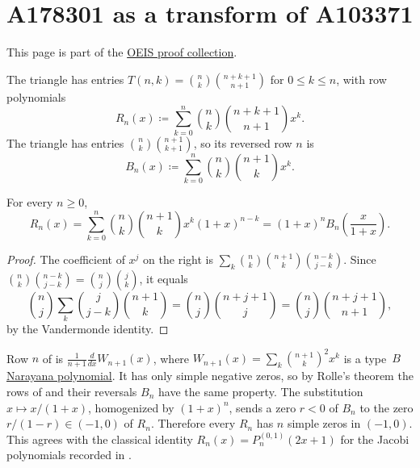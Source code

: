 

\section[oeisProofA178301]{A178301 as a transform of A103371}

This page is part of the \hyperref[oeisProofs]{OEIS proof collection}.

The triangle  has entries
$T(n,k)=\binom{n}{k}\binom{n+k+1}{n+1}$ for $0\leq k\leq n$, with row polynomials
\[
 R_n(x)\coloneqq\sum_{k=0}^n\binom{n}{k}\binom{n+k+1}{n+1}x^k.
\]
The triangle  has entries $\binom{n}{k}\binom{n+1}{k+1}$, so its reversed row $n$
is
\[
 B_n(x)\coloneqq\sum_{k=0}^n\binom{n}{k}\binom{n+1}{k}x^k.
\]

\begin{proposition}
For every $n\geq0$,
\[
 R_n(x)=\sum_{k=0}^n\binom{n}{k}\binom{n+1}{k}x^k(1+x)^{n-k}
 =(1+x)^n B_n\!\left(\frac{x}{1+x}\right).
\]
\end{proposition}

\begin{proof}
The coefficient of $x^j$ on the right is
$\sum_k\binom{n}{k}\binom{n+1}{k}\binom{n-k}{j-k}$.  Since
$\binom{n}{k}\binom{n-k}{j-k}=\binom{n}{j}\binom{j}{k}$, it equals
\[
 \binom{n}{j}\sum_{k}\binom{j}{j-k}\binom{n+1}{k}=\binom{n}{j}\binom{n+j+1}{j}
 =\binom{n}{j}\binom{n+j+1}{n+1},
\]
by the Vandermonde identity.
\end{proof}

Row $n$ of  is $\frac{1}{n+1}\frac{d}{dx}W_{n+1}(x)$, where
$W_{n+1}(x)=\sum_k\binom{n+1}{k}^2x^k$ is a type~$B$
\hyperref[narayanaPolynomialFamiliesRealRooted]{Narayana polynomial}.  It has only simple
negative zeros, so by Rolle's theorem the rows of  and their reversals $B_n$ have
the same property.  The substitution $x\mapsto x/(1+x)$, homogenized by
$(1+x)^n$, sends a zero $r<0$ of $B_n$ to the zero $r/(1-r)\in(-1,0)$ of $R_n$.  Therefore every
$R_n$ has $n$ simple zeros in $(-1,0)$.  This agrees with the classical identity
$R_n(x)=P_n^{(0,1)}(2x+1)$ for the Jacobi polynomials recorded in .
